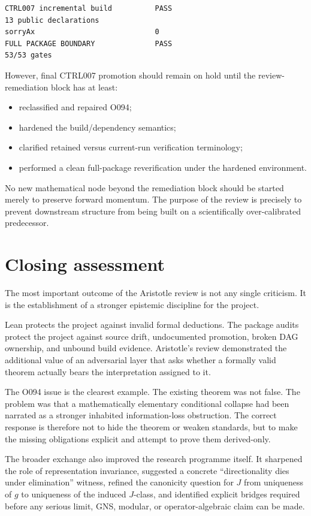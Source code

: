 \documentclass[11pt,a4paper]{article}
\begin{document}
\begin{lstlisting}
CTRL007 incremental build          PASS
13 public declarations
sorryAx                            0
FULL PACKAGE BOUNDARY              PASS
53/53 gates
\end{lstlisting}

However, final CTRL007 promotion should remain on hold until the review-remediation block has at least:

\begin{itemize}
  \item reclassified and repaired O094;
  \item hardened the build/dependency semantics;
  \item clarified retained versus current-run verification terminology;
  \item performed a clean full-package reverification under the hardened environment.
\end{itemize}

No new mathematical node beyond the remediation block should be started merely to preserve forward momentum. The purpose of the review is precisely to prevent downstream structure from being built on a scientifically over-calibrated predecessor.

\section{Closing assessment}

The most important outcome of the Aristotle review is not any single criticism. It is the establishment of a stronger epistemic discipline for the project.

Lean protects the project against invalid formal deductions. The package audits protect the project against source drift, undocumented promotion, broken DAG ownership, and unbound build evidence. Aristotle's review demonstrated the additional value of an adversarial layer that asks whether a formally valid theorem actually bears the interpretation assigned to it.

The O094 issue is the clearest example. The existing theorem was not false. The problem was that a mathematically elementary conditional collapse had been narrated as a stronger inhabited information-loss obstruction. The correct response is therefore not to hide the theorem or weaken standards, but to make the missing obligations explicit and attempt to prove them derived-only.

The broader exchange also improved the research programme itself. It sharpened the role of representation invariance, suggested a concrete ``directionality dies under elimination'' witness, refined the canonicity question for $J$ from uniqueness of $g$ to uniqueness of the induced $J$-class, and identified explicit bridges required before any serious limit, GNS, modular, or operator-algebraic claim can be made.
\end{document}

